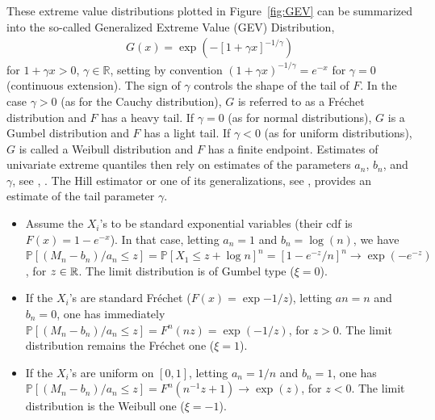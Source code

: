 These extreme value distributions plotted in Figure~\ref{fig:GEV} can be summarized into the so-called Generalized Extreme Value (GEV) Distribution,
\begin{align}
\label{eq:GEV}
G(x) = \exp \left(-\left[1 + \gamma x\right]^{-1/\gamma}\right)
\end{align}
for $1 + \gamma x > 0$, $\gamma \in \mathbb{R}$,
setting by convention $(1 + \gamma x)^{-1/\gamma} = e^{-x}$ for
$\gamma = 0$ (continuous extension). %
The sign of $\gamma$ controls the shape of the tail of $F$.
 In the case $\gamma >0$ (as for the Cauchy distribution), $G$ is referred to as a Fréchet distribution and $F$ has a heavy tail. If $\gamma=0$ (as for normal distributions), $G$ is a Gumbel distribution and $F$ has a light tail. If $\gamma < 0$ (as for uniform distributions), $G$ is called a Weibull distribution and $F$ has a finite endpoint.
Estimates of univariate extreme quantiles then rely on estimates of the parameters $a_n$, $b_n$, and $\gamma$, see \cite{DEd1989}, \cite{ELL2009}. 
The Hill estimator or one of its generalizations, see \cite{Hill1975, Smith1987, BVT1996, Girard2004, Boucheron2015}, provides an estimate of the tail parameter $\gamma$. 
\begin{example}
\begin{itemize}
\item Assume the $X_i$'s to be standard exponential variables (their cdf is $F(x) = 1 - e^{-x}$). In that case, letting $a_n=1$ and $b_n = \log(n)$, we have
$\mathbb{P}[(M_n-b_n)/a_n \le z] = \mathbb{P}[X_1 \le z + \log n ]^n = [1 - e^{-z}/n]^n \to \exp(-e^{-z}) $, for $z \in \mathbb{R}$. The limit distribution is of Gumbel type ($\xi = 0$).
\item If the $X_i$'s are standard Fréchet ($F(x) = \exp{-1/z}$), letting $an = n$ and $b_n = 0$, one has immediately $\mathbb{P}[(M_n-b_n)/a_n \le z] = F^n(nz) = \exp(-1/z)$, for $z >0$. The limit distribution remains the Fréchet one ($\xi = 1$).
\item If the $X_i$'s are uniform on $[0,1]$, letting $a_n = 1/n$ and $b_n = 1$, one has $\mathbb{P}[(M_n-b_n)/a_n \le z] = F^n(n^{-1}z + 1) \to \exp(z)$, for $z <0$. The limit distribution is the Weibull one ($\xi = -1$).

\end{itemize}
\end{example}

